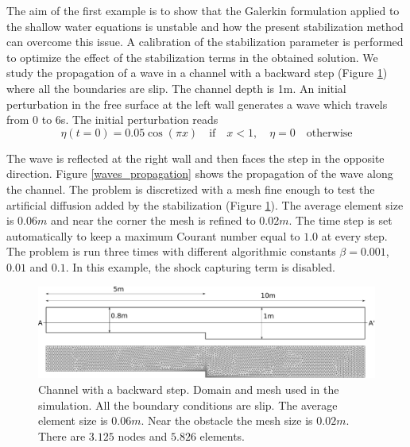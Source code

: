 The aim of the first example is to show that the Galerkin formulation applied to the shallow water equations is unstable and how the present stabilization method can overcome this issue. A calibration of the stabilization parameter is performed to optimize the effect of the stabilization terms in the obtained solution.
We study the propagation of a wave in a channel with a backward step (Figure \ref{step_mesh}) where all the boundaries are slip. The channel depth is 1m. An initial perturbation in the free surface at the left wall generates a wave which travels from 0 to 6s. The initial perturbation reads
\begin{equation}
\eta(t=0) = 0.05\cos(\pi x) \quad \text{if} \quad x<1, \quad \eta=0 \quad \text{otherwise}
\end{equation}


The wave is reflected at the right wall and then faces the step in the opposite direction.
Figure \ref{waves_propagation} shows the propagation of the wave along the channel.
The problem is discretized with a mesh fine enough to test the artificial diffusion added by the stabilization (Figure \ref{step_mesh}). The average element size is $0.06m$ and near the corner the mesh is refined to $0.02m$.
The time step is set automatically to keep a maximum Courant number equal to $1.0$ at every step. The problem is run three times with different algorithmic constants $\beta = 0.001$, $0.01$ and $0.1$. In this example, the shock capturing term is disabled.

\begin{figure}
    \includegraphics[width=\textwidth]{img/eulerian/step/geometry.pdf}
    \caption{Channel with a backward step. Domain and mesh used in the simulation. All the boundary conditions are slip. The average element size is $0.06m$. Near the obstacle the mesh size is $0.02m$. There are $3.125$ nodes and $5.826$ elements.}
    \label{step_mesh}
\end{figure}

